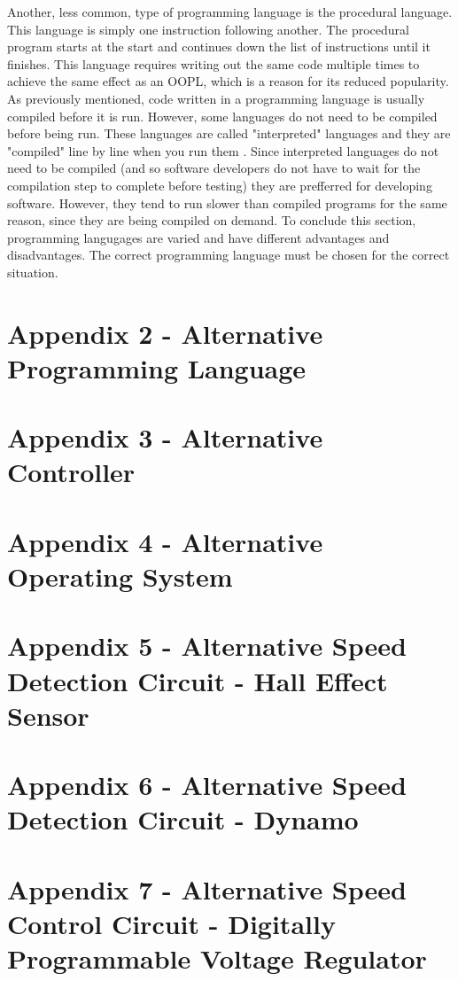 \documentclass{report}
\begin{document}
	Another, less common, type of programming language is the procedural language. This language is simply one instruction following another\cite{proglangwhatisoopl}. The procedural program starts at the start and continues down the list of instructions until it finishes. This language requires writing out the same code multiple times to achieve the same effect as an OOPL, which is a reason for its reduced popularity.\newline \newline  \noindent
	As previously mentioned, code written in a programming language is usually compiled before it is run. However, some languages do not need to be compiled before being run. These languages are called "interpreted" languages and they are "compiled" line by line when you run them \cite{proglanginterp}. Since interpreted languages do not need to be compiled (and so software developers do not have to wait for the compilation step to complete before testing) they are prefferred for developing software. However, they tend to run slower than compiled programs for the same reason, since they are being compiled on demand.\newline \newline  \noindent
	To conclude this section,  programming langugages are varied and have different advantages and disadvantages. The correct programming language must be chosen for the correct situation.\newline \newline  \noindent
\section{Appendix 2 -  Alternative Programming Language}
\section{Appendix 3 -  Alternative Controller}
\section{Appendix 4 -  Alternative Operating System}
\section{Appendix 5 -  Alternative Speed Detection Circuit - Hall Effect Sensor}
\section{Appendix 6 -  Alternative Speed Detection Circuit - Dynamo}
\section{Appendix 7 -  Alternative Speed Control Circuit - Digitally Programmable Voltage Regulator}
\end{document}
